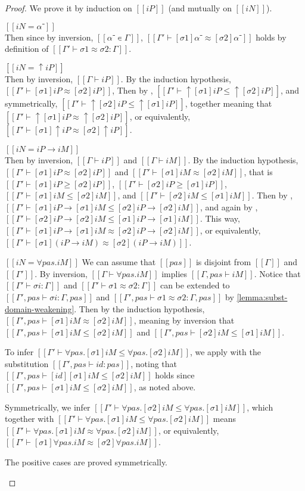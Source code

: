 \lemmaEquivSubstOnSameTerm*
\begin{proof}
  We prove it by induction on $[[iP]]$ (and mutually on $[[iN]]$).
  \begin{caseof}
    \item $[[iN = α⁻]]$\\
      Then since by inversion, $[[α⁻ ∊ Γ]]$, 
      $[[Γ' ⊢ [σ1]α⁻ ≈ [σ2]α⁻]]$ holds by definition of $[[Γ' ⊢ σ1 ≈ σ2 : Γ]]$.
    \item $[[iN = ↑iP]]$\\
      Then by inversion, $[[Γ ⊢ iP]]$.
      By the induction hypothesis, $[[Γ' ⊢ [σ1]iP ≈ [σ2]iP]]$, 
      Then by , 
      $[[Γ' ⊢ ↑[σ1]iP ≤ ↑[σ2]iP]]$, and symmetrically, $[[Γ' ⊢ ↑[σ2]iP ≤ ↑[σ1]iP]]$,
      together meaning that $[[Γ' ⊢ ↑[σ1]iP ≈ ↑[σ2]iP]]$,
      or equivalently, $[[Γ' ⊢ [σ1]↑iP ≈ [σ2]↑iP]]$.
    \item $[[iN = iP → iM]]$\\
      Then by inversion, $[[Γ ⊢ iP]]$ and $[[Γ ⊢ iM]]$.
      By the induction hypothesis, $[[Γ' ⊢ [σ1]iP ≈ [σ2]iP]]$ and
      $[[Γ' ⊢ [σ1]iM ≈ [σ2]iM]]$,
      that is $[[Γ' ⊢ [σ1]iP ≥ [σ2]iP]]$, $[[Γ' ⊢ [σ2]iP ≥ [σ1]iP]]$,
      $[[Γ' ⊢ [σ1]iM ≤ [σ2]iM]]$, and $[[Γ' ⊢ [σ2]iM ≤ [σ1]iM]]$.
      Then by , $[[Γ' ⊢ [σ1]iP → [σ1]iM ≤ [σ2]iP → [σ2]iM]]$, 
      and again by , $[[Γ' ⊢ [σ2]iP → [σ2]iM ≤ [σ1]iP → [σ1]iM]]$.
      This way, $[[Γ' ⊢ [σ1]iP → [σ1]iM ≈ [σ2]iP → [σ2]iM]]$,
      or equivalently, $[[Γ' ⊢ [σ1](iP → iM) ≈ [σ2](iP → iM)]]$.
    \item $[[iN = ∀pas.iM]]$
      We can assume that $[[pas]]$ is disjoint from $[[Γ]]$ and $[[Γ']]$.
      By inversion, $[[Γ ⊢ ∀pas.iM]]$ implies $[[Γ, pas ⊢ iM]]$.
      Notice that $[[Γ' ⊢ σi : Γ]]$ and 
      $[[Γ' ⊢ σ1 ≈ σ2 : Γ]]$
      can be extended to 
      $[[Γ', pas ⊢ σi : Γ, pas]]$
      and 
      $[[Γ', pas ⊢ σ1 ≈ σ2 : Γ, pas]]$
      by \cref{lemma:subst-domain-weakening}.
      Then by the induction hypothesis,
      $[[Γ', pas ⊢ [σ1]iM ≈ [σ2]iM]]$,
      meaning by inversion that
      $[[Γ', pas ⊢ [σ1]iM ≤ [σ2]iM]]$ and 
      $[[Γ', pas ⊢ [σ2]iM ≤ [σ1]iM]]$.

      To infer
      $[[Γ' ⊢ ∀pas.[σ1]iM ≤ ∀pas.[σ2]iM]]$,
      we apply 
      with the substitution $[[Γ', pas ⊢ id :{pas}]]$, 
      noting that $[[Γ', pas ⊢ [id][σ1]iM ≤ [σ2]iM ]]$
      holds since $[[Γ', pas ⊢ [σ1]iM ≤ [σ2]iM ]]$, 
      as noted above. 

      Symmetrically, we infer
      $[[Γ' ⊢ ∀pas.[σ2]iM ≤ ∀pas.[σ1]iM]]$,
      which together with
      $[[Γ' ⊢ ∀pas.[σ1]iM ≤ ∀pas.[σ2]iM]]$
      means
      $[[Γ' ⊢ ∀pas.[σ1]iM ≈ ∀pas.[σ2]iM]]$,
      or equivalently, 
      $[[Γ' ⊢ [σ1]∀pas.iM ≈ [σ2]∀pas.iM]]$.

    \item The positive cases are proved symmetrically.
  \end{caseof}
\end{proof}


